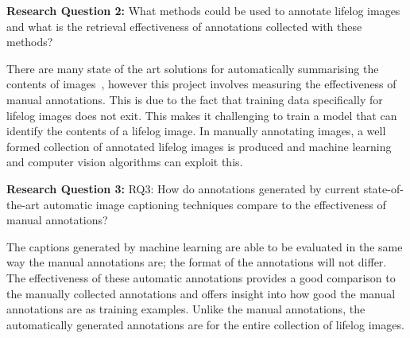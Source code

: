 \textbf{Research Question 2:} What methods could be used to annotate lifelog images and what is the retrieval effectiveness of annotations collected with these methods?

There are many state of the art solutions for automatically summarising the contents of images~\cite{karpathy2015deep}\cite{jia2014caffe}\cite{pan2004gcap}, however this project involves measuring the effectiveness of manual annotations. This is due to the fact that training data specifically for lifelog images does not exit. This makes it challenging to train a model that can identify the contents of a lifelog image. In manually annotating images, a well formed collection of annotated lifelog images is produced and machine learning and computer vision algorithms can exploit this.

\textbf{Research Question 3:} RQ3: How do annotations generated by current state-of-the-art automatic image captioning techniques compare to the effectiveness of manual annotations?

The captions generated by machine learning are able to be evaluated in the same way the manual annotations are; the format of the annotations will not differ. The effectiveness of these automatic annotations provides a good comparison to the manually collected annotations and offers insight into how good the manual annotations are as training examples. Unlike the manual annotations, the automatically generated annotations are for the entire collection of lifelog images. 